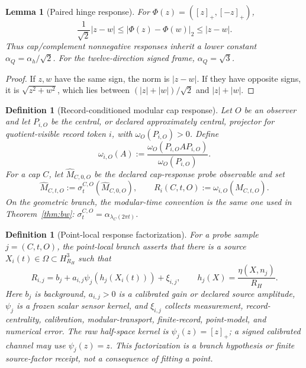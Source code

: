 \documentclass[11pt]{article}
\newtheorem{lemma}[theorem]{Lemma}
\newtheorem{definition}[theorem]{Definition}
\begin{document}
\begin{lemma}[Paired hinge response]\label{lem:paired-hinge-response}
For \(\Phi(z)=([z]_+,[-z]_+)\),
\[
\frac1{\sqrt2}|z-w|\leq |\Phi(z)-\Phi(w)|_2\leq |z-w|.
\]
Thus cap/complement nonnegative responses inherit a lower constant
\(\alpha_Q=\alpha_h/\sqrt2\). For the twelve-direction signed frame,
\(\alpha_Q=\sqrt3\).
\end{lemma}

\begin{proof}
If \(z,w\) have the same sign, the norm is \(|z-w|\). If they have opposite
signs, it is \(\sqrt{z^2+w^2}\), which lies between
\((|z|+|w|)/\sqrt2\) and \(|z|+|w|\).
\end{proof}

\begin{definition}[Record-conditioned modular cap response]
\label{def:record-conditioned-modular-cap-response}
Let \(O\) be an observer and let \(P_{i,O}\) be the central, or declared
approximately central, projector for quotient-visible record token \(i\), with
\(\omega_O(P_{i,O})>0\). Define
\[
\omega_{i,O}(A):=\frac{\omega_O(P_{i,O}AP_{i,O})}{\omega_O(P_{i,O})}.
\]
For a cap \(C\), let \(\widehat M_{C,0,O}\) be the declared cap-response probe
observable and set
\[
\widehat M_{C,t,O}:=\sigma_t^{C,O}(\widehat M_{C,0,O}),\qquad
R_i(C,t,O):=\omega_{i,O}(\widehat M_{C,t,O}).
\]
On the geometric branch, the modular-time convention is the same one used in
Theorem~\ref{thm:bw}: \(\sigma_t^{C,O}=\alpha_{\lambda_C(2\pi t)}\).
\end{definition}

\begin{definition}[Point-local response factorization]
\label{def:point-local-cap-response-factorization}
For a probe sample \(j=(C,t,O)\), the point-local branch asserts that there is
a source \(X_i(t)\in\Omega\subset H^3_{R_H}\) such that
\[
R_{i,j}=b_j+a_{i,j}\psi_j(h_j(X_i(t)))+\xi_{i,j},
\qquad
h_j(X)=\frac{\eta(X,n_j)}{R_H}.
\]
Here \(b_j\) is background, \(a_{i,j}>0\) is a calibrated gain or declared
source amplitude, \(\psi_j\) is a frozen scalar sensor kernel, and \(\xi_{i,j}\)
collects measurement, record-centrality, calibration, modular-transport,
finite-record, point-model, and numerical error. The raw half-space kernel is
\(\psi_j(z)=[z]_+\); a signed calibrated channel may use \(\psi_j(z)=z\). This
factorization is a branch hypothesis or finite source-factor receipt, not a
consequence of fitting a point.
\end{definition}
\end{document}
